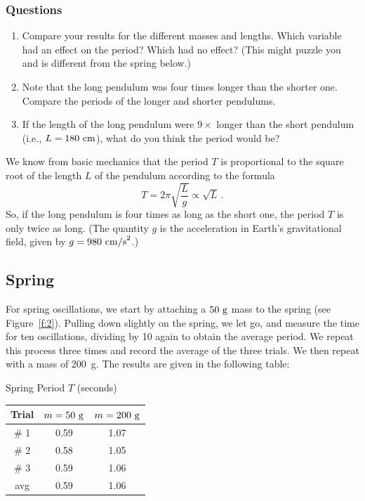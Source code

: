 \documentclass[11pt]{NSF}
\def\be{\begin{equation}}
\def\ee{\end{equation}}
\def\ben{\begin{enumerate}}
\def\een{\end{enumerate}}
\def\i{\item{}}
\begin{document}
\subsubsection*{Questions}
%
\ben
\i Compare your results for the different masses and lengths. 
Which variable had an effect on the period? Which had no effect? 
(This might puzzle you and is different from the spring below.)

\i Note that the long pendulum was four times longer than the shorter one. 
Compare the periods of the longer and shorter pendulums.

\i If the length of the long pendulum were $9\times$ longer 
than the short pendulum (i.e., $L=180~{\rm cm}$), what do you think
the period would be?
\een

We know from basic mechanics that the period $T$ is proportional 
to the square root of the length $L$ of the pendulum according to the formula
\be
T=2\pi\sqrt{\frac{L}{g}}\propto \sqrt{L}\,.
\ee
So, if the long pendulum is four times as long as the short one, 
the period $T$ is only twice as long. 
(The quantity $g$ is the acceleration in Earth’s gravitational field, 
given by $g = 980~{\rm cm/s}^2$.)

\subsection{Spring}

For spring oscillations, we start by attaching a 
$50~{\rm g}$ mass to the spring (see Figure~\ref{f:2}).
Pulling down slightly on the spring, we let go, and measure the time for ten 
oscillations, dividing by 10 again to obtain the average period.
We repeat this process three times and record the average of the three trials.
We then repeat with a mass of 200~g.
The results are given in the following table:
%
\begin{table}[hbtp]
\begin{center}
Spring Period $T$ (seconds)\\
\begin{tabular}{| c | c | c | }
\hline
Trial & $m=50~{\rm g}$ & $m=200~{\rm g}$ \\
\hline
\# 1 & 0.59 & 1.07 \\
\hline
\# 2 & 0.58 & 1.05  \\
\hline
\# 3 & 0.59 & 1.06 \\
\hline
avg  & 0.59 & 1.06 \\
\hline
\end{tabular}
\label{t:2}
\end{center}
\end{table}
%
\end{document}
